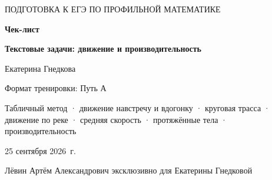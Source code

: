 \documentclass[a4paper,12pt]{article}
\newcommand{\lessondate}{25 сентября 2026~г.}
\begin{document}

\thispagestyle{empty}
\begin{center}

\vspace*{22mm}

{\small\color{softgray}
ПОДГОТОВКА К ЕГЭ ПО ПРОФИЛЬНОЙ МАТЕМАТИКЕ
}\par

\vspace{9mm}

{\Huge\bfseries\color{darkaccent}
Чек-лист
}\par

\vspace{4mm}

{\LARGE\bfseries
Текстовые задачи: движение и производительность
}\par

\vspace{13mm}

{\Large
Екатерина Гнедкова
}\par

\vspace{3mm}

{\large
Формат тренировки: Путь А
}\par

\vspace{15mm}

\begin{minipage}{0.76\textwidth}
\centering
\large
Табличный метод · движение навстречу и вдогонку ·
круговая трасса · движение по реке · средняя скорость ·
протяжённые тела · производительность
\end{minipage}

\vfill

{\normalsize \lessondate}\par

\vspace{4mm}

{\small\color{softgray}
Лёвин Артём Александрович эксклюзивно для Екатерины Гнедковой
}\par

\vspace{16mm}


\end{center}
\end{document}
